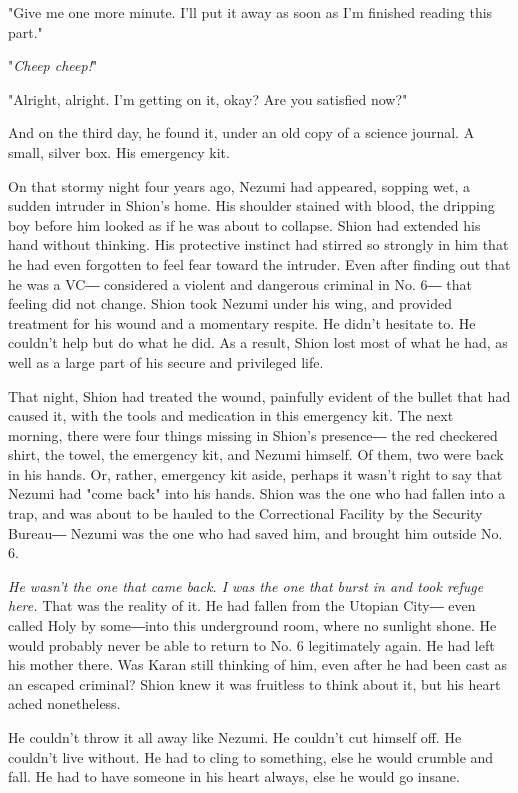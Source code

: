 "Give me one more minute. I'll put it away as soon as I'm finished
reading this part."

"\emph{Cheep cheep!}"

"Alright, alright. I'm getting on it, okay? Are you satisfied now?"

And on the third day, he found it, under an old copy of a science
journal. A small, silver box. His emergency kit.

On that stormy night four years ago, Nezumi had appeared, sopping wet, a
sudden intruder in Shion's home. His shoulder stained with blood, the
dripping boy before him looked as if he was about to collapse. Shion had
extended his hand without thinking. His protective instinct had stirred
so strongly in him that he had even forgotten to feel fear toward the
intruder. Even after finding out that he was a VC― considered a violent
and dangerous criminal in No. 6― that feeling did not change. Shion took
Nezumi under his wing, and provided treatment for his wound and a
momentary respite. He didn't hesitate to. He couldn't help but do what
he did. As a result, Shion lost most of what he had, as well as a large
part of his secure and privileged life.

That night, Shion had treated the wound, painfully evident of the bullet
that had caused it, with the tools and medication in this emergency kit.
The next morning, there were four things missing in Shion's presence―
the red checkered shirt, the towel, the emergency kit, and Nezumi
himself. Of them, two were back in his hands. Or, rather, emergency kit
aside, perhaps it wasn't right to say that Nezumi had "come back" into
his hands. Shion was the one who had fallen into a trap, and was about
to be hauled to the Correctional Facility by the Security Bureau― Nezumi
was the one who had saved him, and brought him outside No. 6.

\emph{He wasn't the one that came back. I was the one that burst in and took
	refuge here.} That was the reality of it. He had fallen from the Utopian
City― even called Holy by some―into this underground room, where no
sunlight shone. He would probably never be able to return to No. 6
legitimately again. He had left his mother there. Was Karan still
thinking of him, even after he had been cast as an escaped criminal?
Shion knew it was fruitless to think about it, but his heart ached
nonetheless.

He couldn't throw it all away like Nezumi. He couldn't cut himself off.
He couldn't live without. He had to cling to something, else he would
crumble and fall. He had to have someone in his heart always, else he
would go insane.

